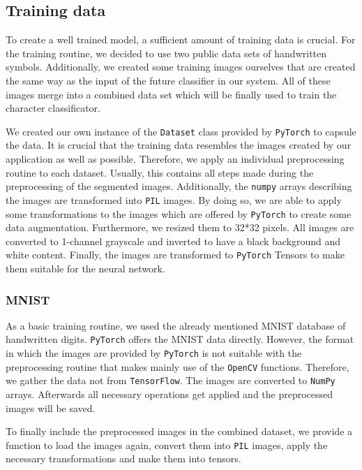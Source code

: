 \documentclass[12pt]{article}
\begin{document}
	\subsection{Training data}
		To create a well trained model, a sufficient amount of training data is crucial. For the training routine, we decided to use two public data sets of handwritten symbols. Additionally, we created some training images ourselves that are created the same way as the input of the future classifier in our system. All of these images merge into a combined data set which will be finally used to train the character classificator.
		
		We created our own instance of the \texttt{Dataset} class provided by \texttt{PyTorch} to capsule the data. It is crucial that the training data resembles the images created by our application as well as possible. Therefore, we apply an individual preprocessing routine to each dataset. Usually, this contains all steps made during the preprocessing of the segmented images. Additionally, the \texttt{numpy} arrays describing the images are transformed into \texttt{PIL} images. By doing so, we are able to apply some transformations to the images which are offered by \texttt{PyTorch} to create some data augmentation. Furthermore, we resized them to 32*32 pixels. All images are converted to 1-channel grayscale and inverted to have a black background and white content. Finally, the images are transformed to \texttt{PyTorch} Tensors to make them suitable for the neural network. 
		
		\subsubsection{MNIST}
			As a basic training routine, we used the already mentioned MNIST database of handwritten digits. \texttt{PyTorch} offers the MNIST data directly. However, the format in which the images are provided by \texttt{PyTorch} is not suitable with the preprocessing routine that makes mainly use of the \texttt{OpenCV} functions. Therefore, we gather the data not from \texttt{TensorFlow}. The images are converted to \texttt{NumPy} arrays. Afterwards all necessary operations get applied and the preprocessed images will be saved. 
			
			To finally include the preprocessed images in the combined dataset, we provide a function to load the images again, convert them into \texttt{PIL} images, apply the necessary transformations and make them into tensors.
			
\end{document}
